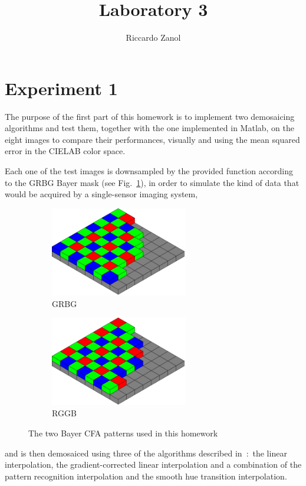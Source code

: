 \documentclass[a4paper,oneside]{article}
\author{Riccardo Zanol}
\title{Laboratory 3}
\begin{document}
\matlabcodeconfig
\maketitle
\section*{Experiment 1} 
The purpose of the first part of this homework is to implement two
demosaicing algorithms and test them, together with the one
implemented in Matlab, on the eight images  to
compare their performances, visually and using the mean squared error
in the CIELAB color space.

Each one of the test images is downsampled by the provided function
 according to the GRBG Bayer mask (see
Fig.~\ref{fig:bayer_grbg}), in order to simulate the kind of data that
would be acquired by a single-sensor imaging system,
\begin{figure}[htbp]
  \centering
  \begin{subfigure}{0.5\textwidth}
    \centering
    \includegraphics[width=0.66\textwidth]{include_imgs/bayer_grbg}
    \caption{GRBG}
    \label{fig:bayer_grbg}
  \end{subfigure}%
  \begin{subfigure}{0.5\textwidth}
    \centering
    \includegraphics[width=0.66\textwidth]{include_imgs/bayer_rggb}
    \caption{RGGB}
    \label{fig:bayer_rggb}
  \end{subfigure}
  \caption{The two Bayer CFA patterns used in this homework}
\end{figure}
and is then demosaiced using three of the algorithms described
in~\cite{demosaic_alg}:~the linear interpolation, the
gradient-corrected linear interpolation and a combination of the
pattern recognition interpolation and the smooth hue transition
interpolation.
\end{document}
